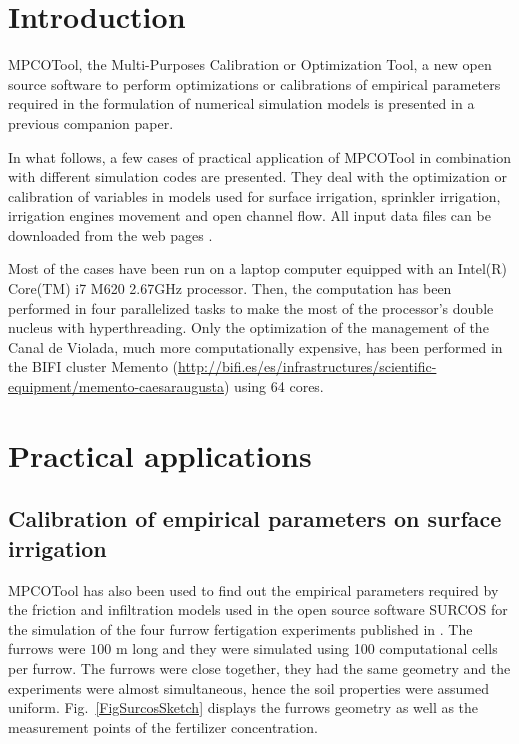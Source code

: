 \documentclass[review,authoryear]{elsarticle}
\begin{document}
\maketitle

\section{Introduction}

MPCOTool, the Multi-Purposes Calibration or Optimization Tool, a new open source
software to perform optimizations or calibrations of empirical parameters
required in the formulation of numerical simulation models is presented in a
previous companion paper.

In what follows, a few cases of practical application of MPCOTool in combination
with different simulation codes are presented. They deal with the optimization
or calibration of variables in models used for surface irrigation, sprinkler
irrigation, irrigation engines movement and open channel flow. All input data
files can be downloaded from the web pages \citep{MPCOToolGit,MPCOTool}.

Most of the cases have been run on a laptop computer equipped with an Intel(R)
Core(TM) i7 M620 2.67GHz processor. Then, the computation has been performed in
four parallelized tasks to make the most of the processor's double nucleus with
hyperthreading. Only the optimization of the management of the Canal de Violada,
much more computationally expensive, has been performed in the BIFI cluster
Memento
(\url{http://bifi.es/es/infrastructures/scientific-equipment/memento-caesaraugusta})
using 64 cores.

\section{Practical applications}

\subsection{Calibration of empirical parameters on surface irrigation}

MPCOTool has also been used to find out the empirical parameters required by the friction and infiltration
models used in the open source software SURCOS \citep{Surcos,SurcosGit,JaviSurcos3} for the simulation of the four furrow fertigation experiments published in \citet{JaviSurcos2}. The furrows were $100$ m long and they were simulated using 100 computational cells per furrow. The furrows were close together, they had the same geometry and the experiments were almost simultaneous, hence the soil properties were assumed uniform. 
Fig.~\ref{FigSurcosSketch} displays the furrows geometry as well as the measurement points of the fertilizer 
concentration. 
\end{document}

